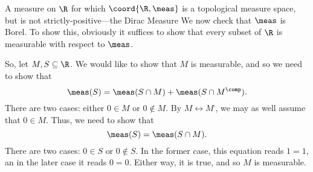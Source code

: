 \begin{exm}{A measure on $\R$ for which $\coord{\R ,\meas}$ is a topological measure space, but is not strictly-positive---the Dirac Measure}{}
We now check that $\meas$ is Borel.  To show this, obviously it suffices to show that every subset of $\R$ is measurable with respect to $\meas$.

So, let $M,S\subseteq \R$.  We would like to show that $M$ is measurable, and so we need to show that
\begin{equation}
\meas (S)=\meas (S\cap M)+\meas (S\cap M^{\comp}).
\end{equation}
There are two cases:  either $0\in M$ or $0\notin M$.  By $M\leftrightarrow M^{\comp}$, we may as well assume that $0\in M$.  Thus, we need to show that
\begin{equation}
\meas (S)=\meas (S\cap M).
\end{equation}
There are two cases:  $0\in S$ or $0\notin S$.  In the former case, this equation reads $1=1$, an in the later case it reads $0=0$.  Either way, it is true, and so $M$ is measurable.
\end{exm}

